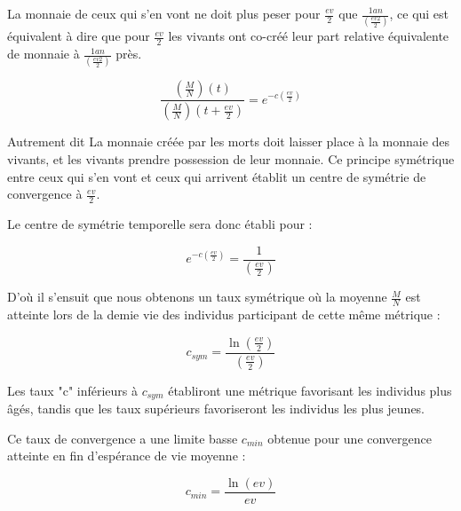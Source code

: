 \documentclass[a4paper,oneside,12pt]{article}
\begin{document}
La monnaie de ceux qui s'en vont ne doit plus peser pour $\frac{ev}{2}$ que $\frac{1 an}{(\frac{ev2}{2})}$, ce qui est équivalent à dire que pour $\frac{ev}{2}$ les vivants ont co-créé leur part relative équivalente de monnaie à $\frac{1 an}{(\frac{ev2}{2})}$ près.

\begin{center}
\begin{displaymath} \frac{\left( \frac{M}{N} \right)(t)}{\left( \frac{M}{N} \right)(t+\frac{ev}{2})}=e^{-c \left( \frac{ev}{2} \right)} \end{displaymath}
\end{center}

Autrement dit La monnaie créée par les morts doit laisser place à la monnaie des vivants, et les vivants prendre possession de leur monnaie. Ce principe symétrique entre ceux qui s'en vont et ceux qui arrivent établit un centre de symétrie de convergence à $\frac{ev}{2}$.

Le centre de symétrie temporelle sera donc établi pour :

\begin{center}
\begin{displaymath}e^{-c \left(\frac{ev}{2}\right)} = \frac{1}{\left( \frac{ev}{2} \right)}\end{displaymath}
\end{center}

D'où il s'ensuit que nous obtenons un taux symétrique où la moyenne $\frac{M}{N}$ est atteinte lors de la demie vie des individus participant de cette même métrique :

\begin{center}
\begin{displaymath}c_{sym}=\frac{\ln(\frac{ev}{2})}{(\frac{ev}{2})}\end{displaymath}
\end{center}

Les taux "c" inférieurs à $c_{sym}$ établiront une métrique favorisant les individus plus âgés, tandis que les taux supérieurs favoriseront les individus les plus jeunes.

Ce taux de convergence a une limite basse $c_{min}$ obtenue pour une convergence atteinte en fin d'espérance de vie moyenne :

\begin{center}
\begin{displaymath}c_{min}=\frac{\ln(ev)}{ev}\end{displaymath}
\end{center}
\end{document}
